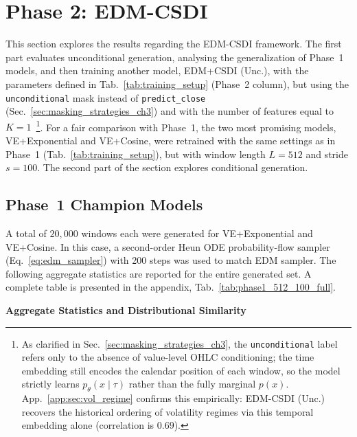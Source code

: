 \section{Phase 2: EDM-CSDI}
\label{sec:ch6_edm_csdi_phase2}
This section explores the results regarding the EDM-CSDI framework. The first part evaluates unconditional generation, analysing the generalization of Phase~1 models, and then training another model, EDM+CSDI (Unc.), with the parameters defined in Tab.\ \ref{tab:training_setup} (Phase~2 column), but using the \texttt{unconditional} mask instead of \texttt{predict\_close} (Sec.\ \ref{sec:masking_strategies_ch3}) and with the number of features equal to \(K=1\)\ \footnote{As clarified in Sec.\ \ref{sec:masking_strategies_ch3}, the \texttt{unconditional} label refers only to the absence of value-level OHLC conditioning; the time embedding still encodes the calendar position of each window, so the model strictly learns \(p_\theta(x \mid \tau)\) rather than the fully marginal \(p(x)\). App.\ \ref{app:sec:vol_regime} confirms this empirically: EDM-CSDI (Unc.) recovers the historical ordering of volatility regimes via this temporal embedding alone (correlation is \(0.69\)).}. For a fair comparison with Phase~1, the two most promising models, VE+Exponential and VE+Cosine, were retrained with the same settings as in Phase~1 (Tab.\ \ref{tab:training_setup}), but with window length \(L=512\) and stride \(s=100\). The second part of the section explores conditional generation.

\subsection{Phase~1 Champion Models}
A total of \(20,000\) windows each were generated for VE+Exponential and VE+Cosine. In this case, a second-order Heun ODE probability-flow sampler (Eq.\ \ref{eq:edm_sampler}) with 200 steps was used to match EDM sampler. The following aggregate statistics are reported for the entire generated set. A complete table is presented in the appendix, Tab.\ \ref{tab:phase1_512_100_full}.

\textbf{Aggregate Statistics and Distributional Similarity} \quad 

